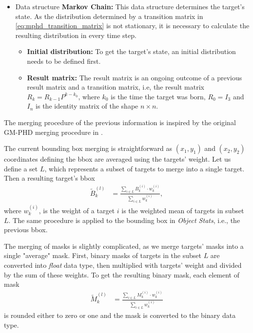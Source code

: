 \begin{itemize}
\begin{itemize}
      \end{itemize}
  \item Data structure \textbf{Markov Chain:} This data structure determines the target's state. As the
  distribution determined by a transition matrix in \eqref{eq:mphd_transition_matrix} is not stationary, it is necessary
  to calculate the resulting distribution in every time step.
      \begin{itemize}
        \item \textbf{Initial distribution:} To get the target's state, an initial distribution needs to be defined
        first.
        \item \textbf{Result matrix:} The result matrix is an ongoing outcome of a previous result matrix and a
        transition
        matrix, i.e, the result matrix $R_k = R_{k-1} P^{k-k_0}$, where $k_0$ is the time the target was born,
        $R_0 = I_3$ and $I_n$ is the identity matrix of the shape $n\times n$.
      \end{itemize}
\end{itemize}

The merging procedure of the previous information is inspired by the original GM-PHD merging procedure in
\cite{VoMaPHD2006}.

The current bounding box merging is straightforward as $(x_1,y_1)$ and $(x_2,y_2)$ coordinates defining the bbox are
averaged using the targets' weight. Let us define a set $L$, which represents a subset of targets to merge into a single
target. Then a resulting target's bbox
\begin{align}
  \tilde{B}_k^{(l)} &= \frac{\sum_{i \in L} B_k^{(i)} \cdot w_k^{(i)}}{\sum_{i \in L}{w_k^{(i)}}},
\end{align}
where $w_k^{(i)}$, is the weight of a target $i$ is the weighted mean of targets in subset $L$. The same procedure is
applied to the bounding box in \textit{Object Stats}, i.e., the previous bbox.

The merging of masks is slightly complicated, as we merge targets' masks into a single "average" mask. First, binary
masks of targets in the subset $L$ are converted into \textit{float} data type, then multiplied with targets' weight
and
divided by the sum of these weights. To get the resulting binary mask, each element of mask
\begin{align}
  \tilde{M}_k^{(l)} &= \frac{\sum_{i \in L} M_k^{(i)} \cdot w_k^{(i)}}{\sum_{i \in L}{w_k^{(i)}}}
\end{align}
is rounded either to zero or one and the mask is converted to the binary data type.

